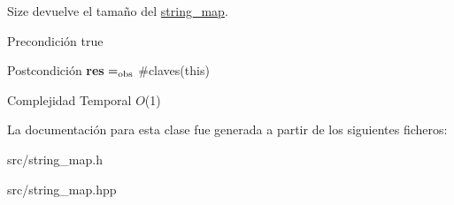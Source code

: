 Size devuelve el tamaño del \hyperlink{classstring__map}{string\+\_\+map}. 

\begin{DoxyPrecond}{Precondición}
true 
\end{DoxyPrecond}
\begin{DoxyPostcond}{Postcondición}
{\bfseries res} $=_{\rm obs}$ \#claves(this)
\end{DoxyPostcond}

\begin{DoxyDescription}
\item[Complejidad Temporal]$O$(1)
\end{DoxyDescription}

La documentación para esta clase fue generada a partir de los siguientes ficheros\+:\begin{DoxyCompactItemize}
\item 
src/string\+\_\+map.\+h\item 
src/string\+\_\+map.\+hpp\end{DoxyCompactItemize}
